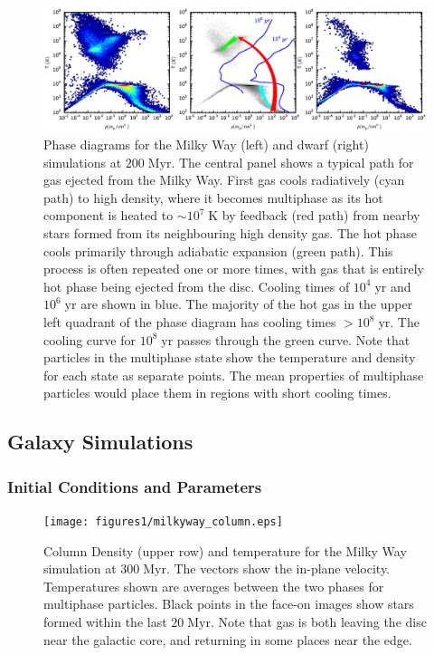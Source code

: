 \begin{figure}
    \includegraphics[width=\textwidth]{figures1/disc_phase.eps}
    \caption[Phase diagram of gas in isolated galaxies]{Phase diagrams for the
    Milky Way (left) and dwarf (right) simulations at $200\;\mathrm{Myr}$.  The
    central panel shows a typical path for gas ejected from the Milky Way.
    First gas cools radiatively (cyan path) to high density, where it becomes
    multiphase as its hot component is heated to $\sim10^7\;\mathrm{K}$ by
    feedback (red path) from nearby stars formed from its neighbouring high
    density gas.  The hot phase cools primarily through adiabatic expansion
    (green path).  This process is often repeated one or more times, with gas
    that is entirely hot phase being ejected from the disc.  Cooling times of
    $10^4\;\mathrm{yr}$ and $10^6\;\mathrm{yr}$ are shown in blue. The
    majority of the hot gas in the upper left quadrant of the phase diagram has
    cooling times $>10^8\;\mathrm{yr}$.  The cooling curve for
    $10^8\;\mathrm{yr}$ passes through the green curve.  Note that particles in
    the multiphase state show the temperature and density for each state as
    separate points.  The mean properties of multiphase particles would place
    them in regions with short cooling times.}
    \label{disc_phase1}
\end{figure}



\subsection{Galaxy Simulations}\label{galaxy1}
\subsubsection{Initial Conditions and Parameters}
\begin{figure}
    \texttt{[image: figures1/milkyway\_column.eps]}
    \caption[Column density and temperature images of isolated Milky Way]{Column
    Density (upper row) and temperature for the Milky Way simulation at
    $300\;\mathrm{Myr}$.  The vectors show the in-plane velocity.  Temperatures
    shown are averages between the two phases for multiphase particles.  Black
    points in the face-on images show stars formed within the last
    $20\;\mathrm{Myr}$. Note that gas is both leaving the disc near the galactic
    core, and returning in some places near the edge.}
    \label{milkyway_column1}
\end{figure}

